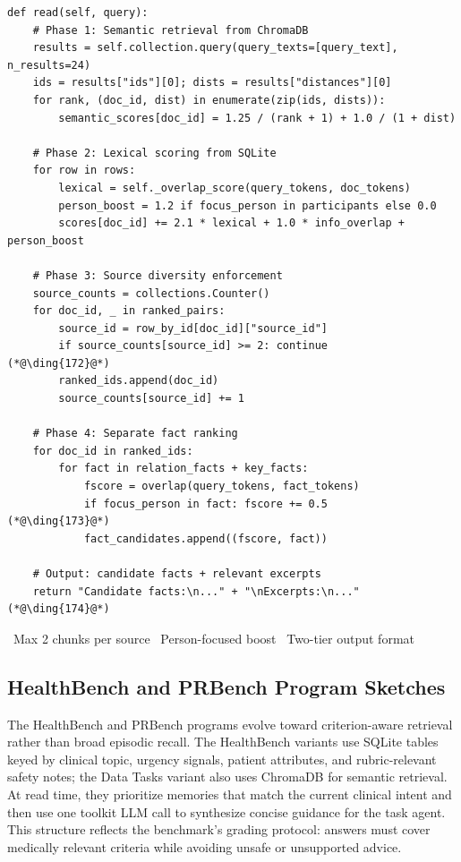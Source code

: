 \begin{lstlisting}[style=evolvedcode, caption={\textcolor{red}{[Revised]} LoCoMo evolved \texttt{read()} excerpt --- hybrid scoring and source diversity.}, label=lst:loco-read]
def read(self, query):
    # Phase 1: Semantic retrieval from ChromaDB
    results = self.collection.query(query_texts=[query_text], n_results=24)
    ids = results["ids"][0]; dists = results["distances"][0]
    for rank, (doc_id, dist) in enumerate(zip(ids, dists)):
        semantic_scores[doc_id] = 1.25 / (rank + 1) + 1.0 / (1 + dist)

    # Phase 2: Lexical scoring from SQLite
    for row in rows:
        lexical = self._overlap_score(query_tokens, doc_tokens)
        person_boost = 1.2 if focus_person in participants else 0.0
        scores[doc_id] += 2.1 * lexical + 1.0 * info_overlap + person_boost

    # Phase 3: Source diversity enforcement
    source_counts = collections.Counter()
    for doc_id, _ in ranked_pairs:
        source_id = row_by_id[doc_id]["source_id"]
        if source_counts[source_id] >= 2: continue     (*@\ding{172}@*)
        ranked_ids.append(doc_id)
        source_counts[source_id] += 1

    # Phase 4: Separate fact ranking
    for doc_id in ranked_ids:
        for fact in relation_facts + key_facts:
            fscore = overlap(query_tokens, fact_tokens)
            if focus_person in fact: fscore += 0.5      (*@\ding{173}@*)
            fact_candidates.append((fscore, fact))

    # Output: candidate facts + relevant excerpts
    return "Candidate facts:\n..." + "\nExcerpts:\n..."  (*@\ding{174}@*)
\end{lstlisting}
\vspace{-0.5em}
{\scriptsize {}~Max 2 chunks per source \quad {}~Person-focused boost \quad {}~Two-tier output format}


\subsection{HealthBench and PRBench Program Sketches}
\label{app:evolved-health-pr}

The HealthBench and PRBench programs evolve toward criterion-aware retrieval rather than broad episodic recall.
The HealthBench variants use SQLite tables keyed by clinical topic, urgency signals, patient attributes, and rubric-relevant safety notes; the Data Tasks variant also uses ChromaDB for semantic retrieval.
At read time, they prioritize memories that match the current clinical intent and then use one toolkit LLM call to synthesize concise guidance for the task agent.
This structure reflects the benchmark's grading protocol: answers must cover medically relevant criteria while avoiding unsafe or unsupported advice.

